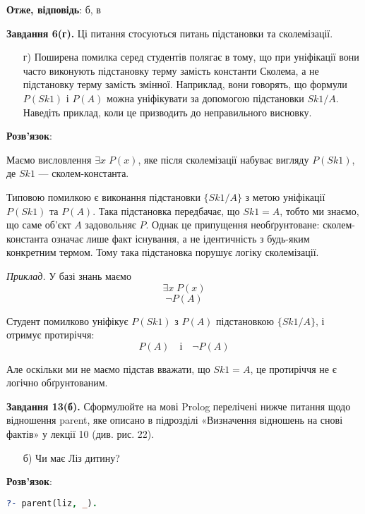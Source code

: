 \documentclass[a4paper,14pt]{extarticle} %
\begin{document}
\textbf{Отже, відповідь}: б, в

\vspace{1cm}
\textbf{Завдання 6(г).} Ці питання стосуються питань підстановки та сколемізації.
\begin{itemize}
    \item[г)] Поширена помилка серед студентів полягає в тому, що при уніфікації
              вони часто виконують підстановку терму замість константи Сколема,
              а не підстановку терму замість змінної. Наприклад, вони говорять,
              що формули $P(Sk1)$ і $P(A)$ можна уніфікувати за допомогою
              підстановки ${Sk1/A}$. Наведіть приклад, коли це призводить до
              неправильного висновку.
\end{itemize}

\textbf{Розв'язок}:

Маємо висловлення $\exists x\; P(x)$, яке після сколемізації набуває вигляду
$P(Sk1)$, де $Sk1$ — сколем-константа.

Типовою помилкою є виконання підстановки $\{Sk1 / A\}$ з метою уніфікації
$P(Sk1)$ та $P(A)$. Така підстановка передбачає, що $Sk1 = A$, тобто ми знаємо,
що саме об'єкт $A$ задовольняє $P$. Однак це припущення необґрунтоване:
сколем-константа означає лише факт існування, а не ідентичність з будь-яким
конкретним термом. Тому така підстановка порушує логіку сколемізації.

\textit{Приклад.}
У базі знань маємо
\[
\exists x\; P(x)
\]
\[
\neg P(A)
\]

Студент помилково уніфікує $P(Sk1)$ з $P(A)$ підстановкою $\{Sk1 / A\}$,
і отримує протиріччя:
\[
P(A) \quad \text{і} \quad \neg P(A)
\]

Але оскільки ми не маємо підстав вважати, що $Sk1 = A$, це протиріччя
не є логічно обґрунтованим.

\vspace{1cm}
\textbf{Завдання 13(б).} Сформулюйте на мові Prolog перелічені нижче питання
щодо відношення parent, яке описано в підрозділі «Визначення відношень на снові
фактів» у лекції 10 (див. рис. 22).

\begin{itemize}
    \item[б)] Чи має Ліз дитину?
\end{itemize}

\textbf{Розв'язок}:
\begin{lstlisting}[language=Prolog]
?- parent(liz, _).
\end{lstlisting}
\end{document}
